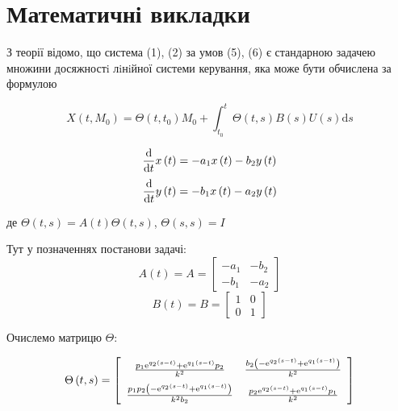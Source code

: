 \documentclass{article}
\begin{document}
\section{Математичні викладки}

З теорії відомо, що система (1), (2) за умов (5), (6) є стандарною задачею множини досяжностi лiнiйної системи керування, яка може бути обчислена за формулою

\begin{equation}
X(t, M_0) = \Theta (t, t_0) M_0 +\int_{t_0}^t \Theta (t, s) B(s)U(s)\mathrm{d}s
\end{equation}
 
\begin{equation}
{\frac {\rm d}{{\rm d}t}}x \left( t \right) =-a_{{1}}x
 \left( t \right) -b_{{2}}y \left( t \right)
\end{equation}
\begin{equation}
 {\frac {\rm d}{{\rm d}t}
}y \left( t \right) =-b_{{1}}x \left( t \right) -a_{{2}}y \left( t
 \right)
\end{equation}

де $\Theta(t, s) = A (t) \Theta (t, s)$, $\Theta (s, s) = I$

Тут у позначеннях постанови задачі:
\begin{equation}
A(t) = A = 
\begin{bmatrix}
    -a_{1} & -b_{2}\\
    -b_{1} & -a_{2}
\end{bmatrix}
\end{equation}
\begin{equation}
B(t) = B = 
\begin{bmatrix}
    1 & 0\\
    0 & 1
\end{bmatrix}
\end{equation}

Очислемо матрицю $\Theta$:

\begin{equation}
\Theta \left( t,s \right) = \left[ \begin {array}{cc} {\frac {p_{{1}}{
{\rm e}^{q_{{2}} \left( s-t \right) }}+{{\rm e}^{q_{{1}} \left( s-t
 \right) }}p_{{2}}}{{k}^{2}}}&{\frac {b_{{2}} \left( -{{\rm e}^{q_{{2}
} \left( s-t \right) }}+{{\rm e}^{q_{{1}} \left( s-t \right) }}
 \right) }{{k}^{2}}}\\ \noalign{\medskip}{\frac {p_{{1}}p_{{2}}
 \left( -{{\rm e}^{q_{{2}} \left( s-t \right) }}+{{\rm e}^{q_{{1}}
 \left( s-t \right) }} \right) }{{k}^{2}b_{{2}}}}&{\frac {p_{{2}}{
{\rm e}^{q_{{2}} \left( s-t \right) }}+{{\rm e}^{q_{{1}} \left( s-t
 \right) }}p_{{1}}}{{k}^{2}}}\end {array} \right]
\end{equation}
\end{document}
